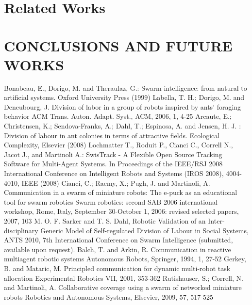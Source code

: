 \documentclass[letterpaper, 10 pt, conference]{ieeeconf}  %
\begin{document}
\section{Related Works}
\label{sec:bg}

\section{CONCLUSIONS AND FUTURE WORKS}
\label{sec:conc}
\begin{thebibliography}{99}
Bonabeau, E., Dorigo, M. and Theraulaz, G.:
Swarm intelligence: from natural to artificial systems.
Oxford University Press (1999)
Labella, T. H.; Dorigo, M. and Deneubourg, J. Division of labor in a group of robots inspired by ants' foraging behavior ACM Trans. Auton. Adapt. Syst., ACM, 2006, 1, 4-25
Arcaute, E.; Christensen, K.; Sendova-Franks, A.; Dahl, T.; Espinosa, A. and Jensen, H. J. : 
Division of labour in ant colonies in terms of attractive fields. 
Ecological Complexity, Elsevier (2008)
Lochmatter T., Roduit P., Cianci C., Correll N., Jacot J., and Martinoli A.: 
SwisTrack - A Flexible Open Source Tracking Software for Multi-Agent Systems. 
In Proceedings of the IEEE/RSJ 2008 International Conference on Intelligent Robots and Systems (IROS 2008), 4004-4010, IEEE (2008)
Cianci, C.; Raemy, X.; Pugh, J. and Martinoli, A. Communication in a swarm of miniature robots: The e-puck as an educational tool for swarm robotics Swarm robotics: second SAB 2006 international workshop, Rome, Italy, September 30-October 1, 2006: revised selected papers, 2007, 103
M. O. F. Sarker and T. S. Dahl, Robotic Validation of an Inter-disciplinary Generic
Model of Self-regulated Division of Labour in Social Systems, ANTS 2010, 7th International Conference on Swarm Intelligence (submitted, available upon request).
Balch, T. and Arkin, R. Communication in reactive multiagent robotic systems Autonomous Robots, Springer, 1994, 1, 27-52
Gerkey, B. and Mataric, M. Principled communication for dynamic multi-robot task allocation Experimental Robotics VII, 2001, 353-362
Rutishauser, S.; Correll, N. and Martinoli, A. Collaborative coverage using a swarm of networked miniature robots Robotics and Autonomous Systems, Elsevier, 2009, 57, 517-525

\end{thebibliography}
\end{document}
